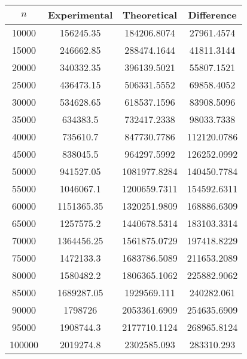 \begin{table}
    \centering
    \begin{minipage}{0.40\textwidth}
        \centering
        \begin{tabular}{|c|c|c|c|}
            \hline 
            $n$ & Experimental & Theoretical & Difference \\ 
            \hline 
            10000 & 156245.35 & 184206.8074 & 27961.4574 \\ 
            15000 & 246662.85 & 288474.1644 & 41811.3144 \\ 
            20000 & 340332.35 & 396139.5021 & 55807.1521 \\ 
            25000 & 436473.15 & 506331.5552 & 69858.4052 \\ 
            30000 & 534628.65 & 618537.1596 & 83908.5096 \\ 
            35000 & 634383.5 & 732417.2338 & 98033.7338 \\ 
            40000 & 735610.7 & 847730.7786 & 112120.0786 \\ 
            45000 & 838045.5 & 964297.5992 & 126252.0992 \\ 
            50000 & 941527.05 & 1081977.8284 & 140450.7784 \\ 
            55000 & 1046067.1 & 1200659.7311 & 154592.6311 \\ 
            60000 & 1151365.35 & 1320251.9809 & 168886.6309 \\ 
            65000 & 1257575.2 & 1440678.5314 & 183103.3314 \\ 
            70000 & 1364456.25 & 1561875.0729 & 197418.8229 \\ 
            75000 & 1472133.3 & 1683786.5089 & 211653.2089 \\ 
            80000 & 1580482.2 & 1806365.1062 & 225882.9062 \\ 
            85000 & 1689287.05 & 1929569.111 & 240282.061 \\ 
            90000 & 1798726 & 2053361.6909 & 254635.6909 \\ 
            95000 & 1908744.3 & 2177710.1124 & 268965.8124 \\ 
            100000 & 2019274.8 & 2302585.093 & 283310.293 \\ 
            \hline 
        \end{tabular}
    \end{minipage}
    \hfill
    \begin{minipage}{0.42\textwidth}
        \centering
        \begin{tabular}{|c|c|c|c|}

\end{tabular}
\end{minipage}
\end{table}
